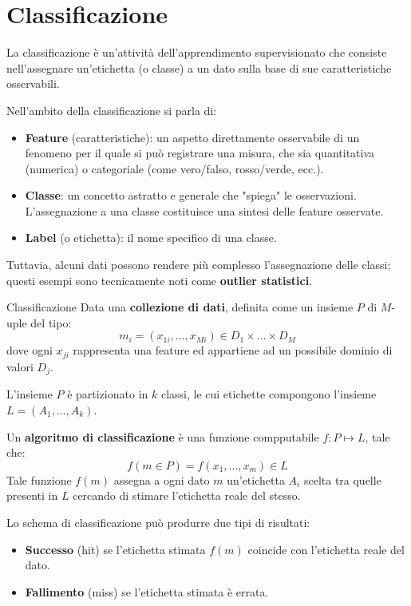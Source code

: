 \section{Classificazione}

La classificazione è un'attività dell'apprendimento supervisionato che
consiste nell'assegnare un'etichetta (o classe) a un dato
sulla base di sue caratteristiche osservabili.

Nell'ambito della classificazione si parla di:
\begin{itemize}
    \item \textbf{Feature} (caratteristiche): un aspetto direttamente
    osservabile di un fenomeno per il quale si può registrare una
    misura, che sia quantitativa (numerica) o categoriale
    (come vero/falso, rosso/verde, ecc.).
    \item \textbf{Classe}: un concetto astratto
    e generale che "spiega" le osservazioni. L'assegnazione
    a una classe costituisce una sintesi delle feature osservate.
    \item \textbf{Label} (o etichetta): il nome specifico di una classe.
\end{itemize}

Tuttavia, alcuni dati possono rendere più complesso
l'assegnazione delle classi; questi esempi sono tecnicamente noti come
\textbf{outlier statistici}.

\begin{definizione}{Classificazione}
Data una \textbf{collezione di dati}, definita come un insieme $P$
di $M$-uple del tipo:
\[
m_i = (x_{1i}, \ldots, x_{Mi}) \in D_1 \times \ldots \times D_M
\]
dove ogni $x_{ji}$ rappresenta una feature ed appartiene ad un possibile
dominio di valori $D_j$.

L'insieme $P$ è partizionato in $k$ classi, le cui etichette
compongono l'insieme $L = (A_1, \ldots, A_k)$.

Un \textbf{algoritmo di classificazione} è una funzione compputabile
$f: P \mapsto L$, tale che:
\[
f(m \in P) = f(x_1, \ldots, x_m) \in L
\]
Tale funzione $f(m)$ assegna a ogni dato $m$ un'etichetta $A_i$ scelta
tra quelle presenti in $L$ cercando di stimare l'etichetta reale del stesso.

Lo schema di classificazione può produrre due tipi di risultati:
\begin{itemize}
    \item \textbf{Successo} (hit) se l'etichetta stimata $f(m)$
    coincide con l'etichetta reale del dato.
    \item \textbf{Fallimento} (miss) se l'etichetta stimata è errata.
\end{itemize}

\end{definizione}

